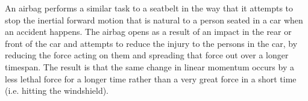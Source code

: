 
An airbag performs a similar task to a seatbelt in the way that it attempts to stop the inertial forward motion that is natural to a person seated in a car when an accident happens. The airbag opens as a result of an impact in the rear or front of the car and attempts to reduce the injury to the persons in the car, by reducing the force acting on them and spreading that force out over a longer timespan. The result is that the same change in linear momentum occurs by a less lethal force for a longer time rather than a very great force in a short time (i.e. hitting the windshield). 

